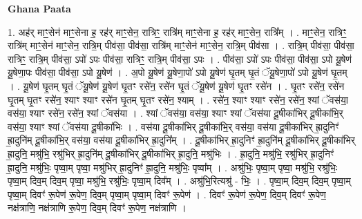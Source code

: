 \documentclass[17pt]{extarticle}
\begin{document}
\textbf{Ghana Paata } \newline

1. अह॑र् माꣳ॒॒सेन॑ माꣳ॒॒सेना ह॒ रह॑र् माꣳ॒॒सेन॒ रात्रिꣳ॒॒ रात्रि॑म् माꣳ॒॒सेना ह॒ रह॑र् माꣳ॒॒सेन॒ रात्रि᳚म् । . माꣳ॒॒सेन॒ रात्रिꣳ॒॒ रात्रि॑म् माꣳ॒॒सेन॑ माꣳ॒॒सेन॒ रात्रि॒म् पीव॑सा॒ पीव॑सा॒ रात्रि॑म् माꣳ॒॒सेन॑ माꣳ॒॒सेन॒ रात्रि॒म् पीव॑सा । . रात्रि॒म् पीव॑सा॒ पीव॑सा॒ रात्रिꣳ॒॒ रात्रि॒म् पीव॑सा॒ ऽपो॑ ऽपः पीव॑सा॒ रात्रिꣳ॒॒ रात्रि॒म् पीव॑सा॒ ऽपः । . पीव॑सा॒ ऽपो॑ ऽपः पीव॑सा॒ पीव॑सा॒ ऽपो यू॒षेण॑ यू॒षेणा॒पः पीव॑सा॒ पीव॑सा॒ ऽपो यू॒षेण॑ । . अ॒पो यू॒षेण॑ यू॒षेणा॒पो॑ ऽपो यू॒षेण॑ घृ॒तम् घृ॒तं ॅयू॒षेणा॒पो॑ ऽपो यू॒षेण॑ घृ॒तम् । . यू॒षेण॑ घृ॒तम् घृ॒तं ॅयू॒षेण॑ यू॒षेण॑ घृ॒तꣳ रसे॑न॒ रसे॑न घृ॒तं ॅयू॒षेण॑ यू॒षेण॑ घृ॒तꣳ रसे॑न । . घृ॒तꣳ रसे॑न॒ रसे॑न घृ॒तम् घृ॒तꣳ रसे॑न॒ श्याꣳ श्याꣳ रसे॑न घृ॒तम् घृ॒तꣳ रसे॑न॒ श्याम् । . रसे॑न॒ श्याꣳ श्याꣳ रसे॑न॒ रसे॑न॒ श्यां ॅवस॑या॒ वस॑या॒ श्याꣳ रसे॑न॒ रसे॑न॒ श्यां ॅवस॑या । . श्यां ॅवस॑या॒ वस॑या॒ श्याꣳ श्यां ॅवस॑या दू॒षीका॑भिर् दू॒षीका॑भि॒र् वस॑या॒ श्याꣳ श्यां ॅवस॑या दू॒षीका॑भिः । . वस॑या दू॒षीका॑भिर् दू॒षीका॑भि॒र् वस॑या॒ वस॑या दू॒षीका॑भिर् ह्रा॒दुनिꣳ॑ ह्रा॒दुनि॑म् दू॒षीका॑भि॒र् वस॑या॒ वस॑या दू॒षीका॑भिर् ह्रा॒दुनि᳚म् । . दू॒षीका॑भिर् ह्रा॒दुनिꣳ॑ ह्रा॒दुनि॑म् दू॒षीका॑भिर् दू॒षीका॑भिर् ह्रा॒दुनि॒ मश्रु॑भि॒ रश्रु॑भिर् ह्रा॒दुनि॑म् दू॒षीका॑भिर् दू॒षीका॑भिर् ह्रा॒दुनि॒ मश्रु॑भिः । . ह्रा॒दुनि॒ मश्रु॑भि॒ रश्रु॑भिर् ह्रा॒दुनिꣳ॑ ह्रा॒दुनि॒ मश्रु॑भिः॒ पृष्वा॒म् पृष्वा॒ मश्रु॑भिर् ह्रा॒दुनिꣳ॑ ह्रा॒दुनि॒ मश्रु॑भिः॒ पृष्वा᳚म् । . अश्रु॑भिः॒ पृष्वा॒म् पृष्वा॒ मश्रु॑भि॒ रश्रु॑भिः॒ पृष्वा॒म् दिव॒म् दिव॒म् पृष्वा॒ मश्रु॑भि॒ रश्रु॑भिः॒ पृष्वा॒म् दिव᳚म् । . अश्रु॑भि॒रित्यश्रु॑ - भिः॒ । . पृष्वा॒म् दिव॒म् दिव॒म् पृष्वा॒म् पृष्वा॒म् दिवꣳ॑ रू॒पेण॑ रू॒पेण॒ दिव॒म् पृष्वा॒म् पृष्वा॒म् दिवꣳ॑ रू॒पेण॑ । . दिवꣳ॑ रू॒पेण॑ रू॒पेण॒ दिव॒म् दिवꣳ॑ रू॒पेण॒ नक्ष॑त्राणि॒ नक्ष॑त्राणि रू॒पेण॒ दिव॒म् दिवꣳ॑ रू॒पेण॒ नक्ष॑त्राणि । \newline
\end{document}
